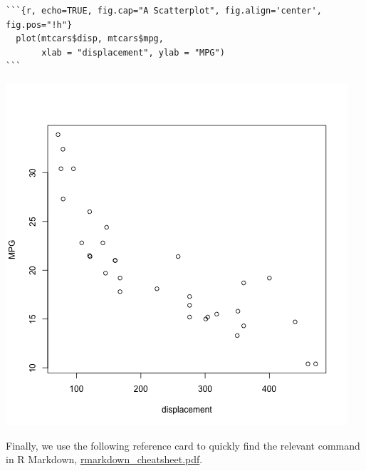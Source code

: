 \documentclass[11pt]{article}
\begin{document}
\begin{verbatim}
```{r, echo=TRUE, fig.cap="A Scatterplot", fig.align='center', fig.pos="!h"}
  plot(mtcars$disp, mtcars$mpg,
       xlab = "displacement", ylab = "MPG")
```
\end{verbatim}

\begin{center}
\includegraphics[width=.9\linewidth]{scatterplot.png}
\end{center}

Finally, we use the following reference card to quickly find the
relevant command in R Markdown,
\href{./rmarkdown\_cheatsheet.pdf}{rmarkdown\_cheatsheet.pdf}.
\end{document}
